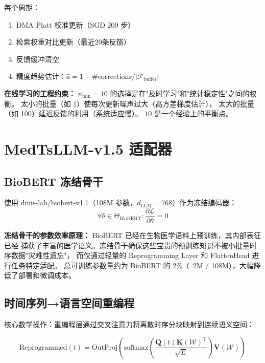 \documentclass[11pt,a4paper]{ctexart}
\theoremstyle{remark}
\begin{document}
每个周期：
\begin{enumerate}[nosep]
\item DMA Platt 校准更新（SGD 200 步）
\item 检索权重对比更新（最近20条反馈）
\item 反馈缓冲清空
\item 精度趋势估计：$\hat{a} = 1 - \#\text{corrections} / |\mathcal{F}_{\text{buffer}}|$
\end{enumerate}

\textbf{在线学习的工程约束：} $n_{\min} = 10$ 的选择是在"及时学习"和"统计稳定性"之间的权衡。
太小的批量（如 1）使每次更新噪声过大（高方差梯度估计），
太大的批量（如 100）延迟反馈的利用（系统适应慢）。
$10$ 是一个经验上的平衡点。

\section{MedTsLLM-v1.5 适配器}

\subsection{BioBERT 冻结骨干}

使用 dmis-lab/biobert-v1.1（108M 参数，$d_{\text{LLM}} = 768$）作为冻结编码器：
\begin{equation}
\forall \theta \in \Theta_{\text{BioBERT}}: \frac{\partial \mathcal{L}}{\partial \theta} = 0
\end{equation}

\textbf{冻结骨干的参数效率原理：} BioBERT 已经在生物医学语料上预训练，其内部表征已经
捕获了丰富的医学语义。冻结骨干确保这些宝贵的预训练知识不被小批量时序数据"灾难性遗忘"，
而仅通过轻量的 Reprogramming Layer 和 FlattenHead 进行任务特定适配。
总可训练参数量约为 BioBERT 的 2\%（~2M / 108M），大幅降低了部署和微调成本。

\subsection{时间序列→语言空间重编程}

核心数学操作：重编程层通过交叉注意力将离散时序分块映射到连续语义空间：

\begin{equation}
\text{Reprogrammed}(t) = \text{OutProj}\left(\text{softmax}\left(\frac{\mathbf{Q}(t)\mathbf{K}(\mathcal{W})^{\top}}{\sqrt{E}}\right) \mathbf{V}(\mathcal{W})\right)
\end{equation}
\end{document}
